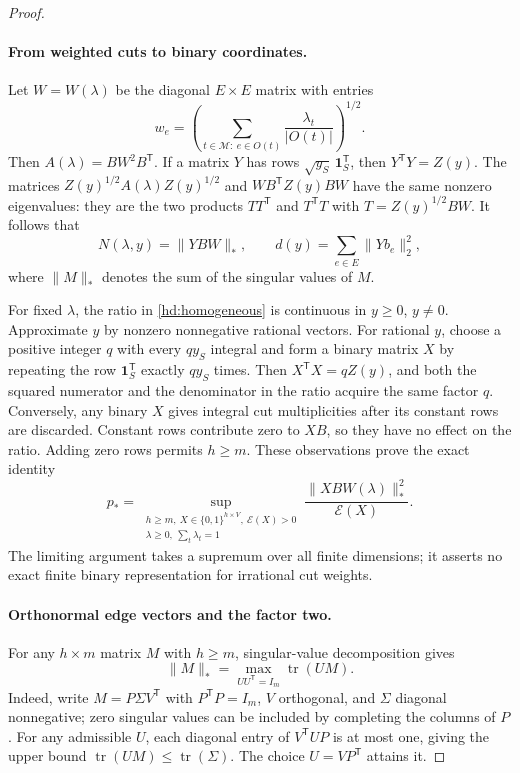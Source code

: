 \documentclass[11pt]{amsart}
\theoremstyle{definition}
\theoremstyle{remark}
\numberwithin{equation}{section}
\begin{document}
\begin{proof}
\paragraph{From weighted cuts to binary coordinates.}
Let $W=W(\lambda)$ be the diagonal $E\times E$ matrix with entries
\begin{equation}
\label{hd:weights}
 w_e=\left(\sum_{t\in\mathcal M:\ e\in O(t)}
                      \frac{\lambda_t}{|O(t)|}\right)^{1/2}.
\end{equation}
Then $A(\lambda)=BW^2B^{\mathsf T}$.  If a matrix $Y$ has rows
$\sqrt{y_S}\,\mathbf1_S^{\mathsf T}$, then $Y^{\mathsf T}Y=Z(y)$.
The matrices $Z(y)^{1/2}A(\lambda)Z(y)^{1/2}$ and
$WB^{\mathsf T}Z(y)BW$ have the same nonzero eigenvalues: they are
the two products $TT^{\mathsf T}$ and $T^{\mathsf T}T$ with
$T=Z(y)^{1/2}BW$.  It follows that
\[
 N(\lambda,y)=\|YBW\|_*,\qquad
 d(y)=\sum_{e\in E}\|Yb_e\|_2^2,
\]
where $\|M\|_*$ denotes the sum of the singular values of $M$.

For fixed $\lambda$, the ratio in \eqref{hd:homogeneous} is continuous
in $y\geq0$, $y\ne0$.  Approximate $y$ by nonzero nonnegative rational
vectors.  For rational $y$, choose a positive integer $q$ with every
$qy_S$ integral and form a binary matrix $X$ by repeating the row
$\mathbf1_S^{\mathsf T}$ exactly $qy_S$ times.  Then
$X^{\mathsf T}X=qZ(y)$, and both the squared numerator and the
denominator in the ratio acquire the same factor $q$.  Conversely,
any binary $X$ gives integral cut multiplicities after its constant
rows are discarded.  Constant rows contribute zero to $XB$, so they
have no effect on the ratio.  Adding zero rows permits $h\geq m$.
These observations prove the exact identity
\begin{equation}
\label{hd:binary-nuclear}
 p_*=
 \sup_{\substack{h\geq m,\ X\in\{0,1\}^{h\times V},\ \mathcal E(X)>0\\
                  \lambda\geq0,\ \sum_t\lambda_t=1}}
 \frac{\|XBW(\lambda)\|_*^2}{\mathcal E(X)}.
\end{equation}
The limiting argument takes a supremum over all finite dimensions;
it asserts no exact finite binary representation for irrational
cut weights.

\paragraph{Orthonormal edge vectors and the factor two.}
For any $h\times m$ matrix $M$ with $h\geq m$, singular-value
decomposition gives
\begin{equation}
\label{hd:polar}
 \|M\|_*=\max_{UU^{\mathsf T}=I_m}\operatorname{tr}(UM).
\end{equation}
Indeed, write $M=P\Sigma V^{\mathsf T}$ with
$P^{\mathsf T}P=I_m$, $V$ orthogonal, and $\Sigma$ diagonal
nonnegative; zero singular values can be included by completing the
columns of $P$.  For any admissible $U$, each diagonal entry of
$V^{\mathsf T}UP$ is at most one, giving the upper bound
$\operatorname{tr}(UM)\leq\operatorname{tr}(\Sigma)$.
The choice $U=VP^{\mathsf T}$ attains it.


\end{proof}
\end{document}
